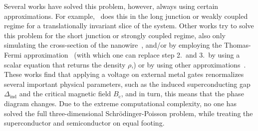 Several works have solved this problem, however, always using certain approximations.
For example,~\cite{Vuik2016} does this in the long junction or weakly coupled regime for a translationally invariant slice of the system.
Other works try to solve this problem for the short junction or strongly coupled regime, also only simulating the cross-section of the nanowire~\cite{Antipov2018}, and/or by employing the Thomas-Fermi approximation~\cite{Mikkelsen2018,Winkler2019} (with which one can replace step 2.~and 3.~by using a scalar equation that returns the density $\rho$,) or by using other approximations~\cite{Escribano2017,Dominguez2017,Woods2018}.
These works find that applying a voltage on external metal gates renormalizes several important physical parameters, such as the induced superconducting gap $\Delta_\textrm{ind}$ and the critical magnetic field $B_\textrm{c}$, and in turn, this means that the phase diagram changes.
Due to the extreme computational complexity, no one has solved the full three-dimensional Schrödinger-Poisson problem, while treating the superconductor and semiconductor on equal footing.

